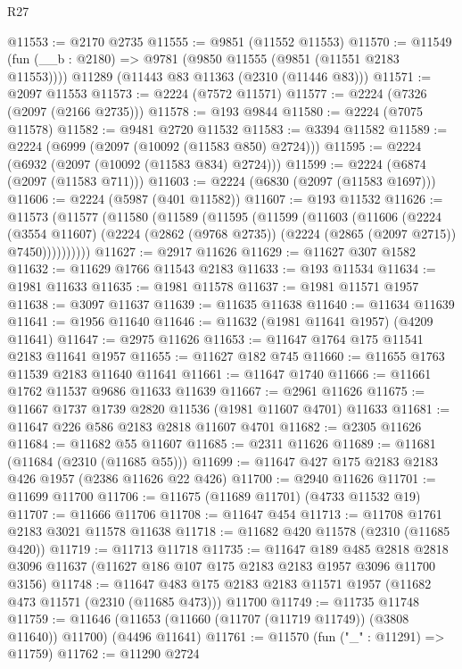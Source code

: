 \begin{lexlean}{R27}
\begin{coremodule}
@11553 := @2170 @2735
@11555 := @9851 (@11552 @11553)
@11570 := @11549
    (fun (__b : @2180) => @9781 (@9850 @11555 (@9851 (@11551 @2183 @11553))))
    @11289
    (@11443 @83 @11363 (@2310 (@11446 @83)))
@11571 := @2097 @11553
@11573 := @2224 (@7572 @11571)
@11577 := @2224 (@7326 (@2097 (@2166 @2735)))
@11578 := @193 @9844
@11580 := @2224 (@7075 @11578)
@11582 := @9481 @2720 @11532
@11583 := @3394 @11582
@11589 := @2224 (@6999 (@2097 (@10092 (@11583 @850) @2724)))
@11595 := @2224 (@6932 (@2097 (@10092 (@11583 @834) @2724)))
@11599 := @2224 (@6874 (@2097 (@11583 @711)))
@11603 := @2224 (@6830 (@2097 (@11583 @1697)))
@11606 := @2224 (@5987 (@401 @11582))
@11607 := @193 @11532
@11626 := @11573
    (@11577
      (@11580
        (@11589
          (@11595
            (@11599
              (@11603
                (@11606
                  (@2224
                    (@3554 @11607)
                    (@2224 (@2862 (@9768 @2735)) (@2224 (@2865 (@2097 @2715)) @7450))))))))))
@11627 := @2917 @11626
@11629 := @11627 @307 @1582
@11632 := @11629 @1766 @11543 @2183
@11633 := @193 @11534
@11634 := @1981 @11633
@11635 := @1981 @11578
@11637 := @1981 @11571 @1957
@11638 := @3097 @11637
@11639 := @11635 @11638
@11640 := @11634 @11639
@11641 := @1956 @11640
@11646 := @11632 (@1981 @11641 @1957) (@4209 @11641)
@11647 := @2975 @11626
@11653 := @11647 @1764 @175 @11541 @2183 @11641 @1957
@11655 := @11627 @182 @745
@11660 := @11655 @1763 @11539 @2183 @11640 @11641
@11661 := @11647 @1740
@11666 := @11661 @1762 @11537 @9686 @11633 @11639
@11667 := @2961 @11626
@11675 := @11667 @1737 @1739 @2820 @11536 (@1981 @11607 @4701) @11633
@11681 := @11647 @226 @586 @2183 @2818 @11607 @4701
@11682 := @2305 @11626
@11684 := @11682 @55 @11607
@11685 := @2311 @11626
@11689 := @11681 (@11684 (@2310 (@11685 @55)))
@11699 := @11647 @427 @175 @2183 @2183 @426 @1957 (@2386 @11626 @22 @426)
@11700 := @2940 @11626
@11701 := @11699 @11700
@11706 := @11675 (@11689 @11701) (@4733 @11532 @19)
@11707 := @11666 @11706
@11708 := @11647 @454
@11713 := @11708 @1761 @2183 @3021 @11578 @11638
@11718 := @11682 @420 @11578 (@2310 (@11685 @420))
@11719 := @11713 @11718
@11735 := @11647
    @189
    @485
    @2818
    @2818
    @3096
    @11637
    (@11627 @186 @107 @175 @2183 @2183 @1957 @3096 @11700 @3156)
@11748 := @11647
    @483
    @175
    @2183
    @2183
    @11571
    @1957
    (@11682 @473 @11571 (@2310 (@11685 @473)))
    @11700
@11749 := @11735 @11748
@11759 := @11646 (@11653 (@11660 (@11707 (@11719 @11749)) (@3808 @11640)) @11700) (@4496 @11641)
@11761 := @11570 (fun ("_" : @11291) => @11759)
@11762 := @11290 @2724

\end{coremodule}
\end{lexlean}
